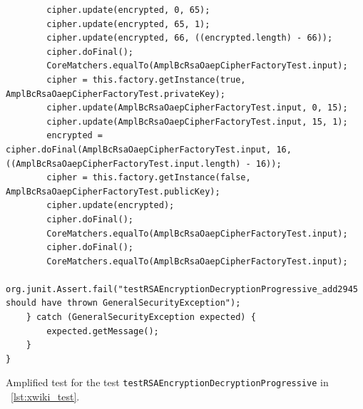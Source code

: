 \documentclass[a4paper,11pt]{sdm_internship}
\theoremstyle{definition}
\begin{document}
\begin{appendices}
\begin{listing}[H]
\begin{verbatim}
        cipher.update(encrypted, 0, 65);
        cipher.update(encrypted, 65, 1);
        cipher.update(encrypted, 66, ((encrypted.length) - 66));
        cipher.doFinal();
        CoreMatchers.equalTo(AmplBcRsaOaepCipherFactoryTest.input);
        cipher = this.factory.getInstance(true, AmplBcRsaOaepCipherFactoryTest.privateKey);
        cipher.update(AmplBcRsaOaepCipherFactoryTest.input, 0, 15);
        cipher.update(AmplBcRsaOaepCipherFactoryTest.input, 15, 1);
        encrypted = cipher.doFinal(AmplBcRsaOaepCipherFactoryTest.input, 16, ((AmplBcRsaOaepCipherFactoryTest.input.length) - 16));
        cipher = this.factory.getInstance(false, AmplBcRsaOaepCipherFactoryTest.publicKey);
        cipher.update(encrypted);
        cipher.doFinal();
        CoreMatchers.equalTo(AmplBcRsaOaepCipherFactoryTest.input);
        cipher.doFinal();
        CoreMatchers.equalTo(AmplBcRsaOaepCipherFactoryTest.input);
        org.junit.Assert.fail("testRSAEncryptionDecryptionProgressive_add2945 should have thrown GeneralSecurityException");
    } catch (GeneralSecurityException expected) {
        expected.getMessage();
    }
}
  \end{verbatim}
  \caption{Amplified test for the test \texttt{testRSAEncryptionDecryptionProgressive} in \listingname~\ref{lst:xwiki_test}.}%
\label{lst:xwiki_amp_test}
\end{listing}


\end{appendices}
\end{document}
